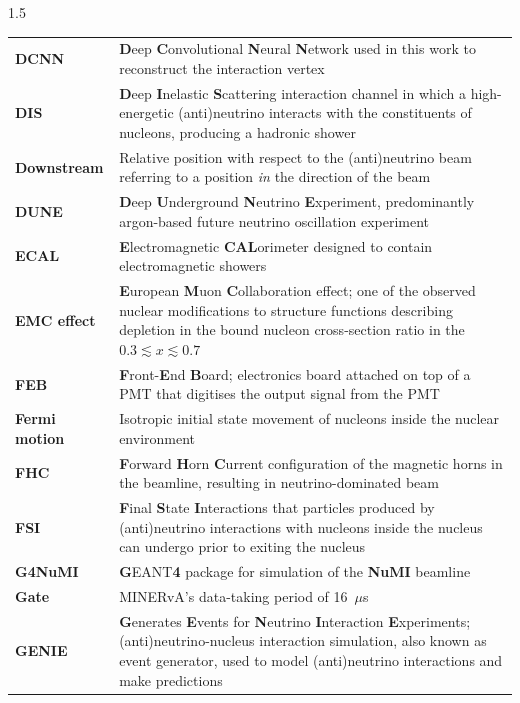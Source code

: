 \begin{spacing}{1.5}
\begin{longtable}[l]{p{} p{}}
        \textbf{DCNN} & \textbf{D}eep \textbf{C}onvolutional \textbf{N}eural \textbf{N}etwork used in this work to reconstruct the interaction vertex  \\
        \textbf{DIS} & \textbf{D}eep \textbf{I}nelastic \textbf{S}cattering interaction channel in which a high-energetic (anti)neutrino interacts with the constituents of nucleons, producing a hadronic shower  \\
        \textbf{Downstream} & Relative position with respect to the (anti)neutrino beam referring to a position \textit{in} the direction of the beam   \\
        \textbf{DUNE} & \textbf{D}eep \textbf{U}nderground \textbf{N}eutrino \textbf{E}xperiment, predominantly argon-based future neutrino oscillation experiment  \\
        \textbf{ECAL} & \textbf{E}lectromagnetic \textbf{CAL}orimeter designed to contain electromagnetic showers  \\
        \textbf{EMC effect} & \textbf{E}uropean \textbf{M}uon \textbf{C}ollaboration effect; one of the observed nuclear modifications to structure functions describing depletion in the bound nucleon cross-section ratio in the $0.3 \lesssim x \lesssim 0.7$   \\ 
        \textbf{FEB} & \textbf{F}ront-\textbf{E}nd \textbf{B}oard; electronics board attached on top of a PMT that digitises the output signal from the PMT \\
        \textbf{Fermi motion} & Isotropic initial state movement of nucleons inside the nuclear environment \\
        \textbf{FHC} & \textbf{F}orward \textbf{H}orn \textbf{C}urrent configuration of the magnetic horns in the beamline, resulting in neutrino-dominated beam  \\
        \textbf{FSI} & \textbf{F}inal \textbf{S}tate \textbf{I}nteractions that particles produced by (anti)neutrino interactions with nucleons inside the nucleus can undergo prior to exiting the nucleus \\
        \textbf{G4NuMI} & \textbf{G}EANT\textbf{4} package for simulation of the \textbf{NuMI} beamline  \\
        \textbf{Gate} & MINERvA's data-taking period of 16~$\mu$s   \\
        \textbf{GENIE} & \textbf{G}enerates \textbf{E}vents for \textbf{N}eutrino \textbf{I}nteraction \textbf{E}xperiments; (anti)neutrino-nucleus interaction simulation, also known as event generator, used to model (anti)neutrino interactions and make predictions  \\

\end{longtable}
\end{spacing}
